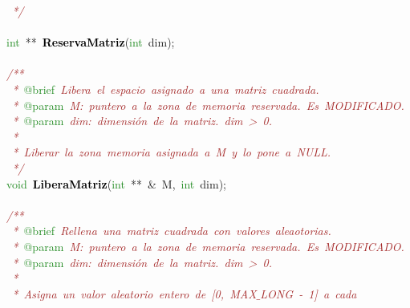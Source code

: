 \mbox{}\textit{\textcolor{Brown}{\ */}} \\
\mbox{} \\
\mbox{}\textcolor{ForestGreen}{int}\ \textcolor{BrickRed}{**}\ \textbf{\textcolor{Black}{ReservaMatriz}}\textcolor{BrickRed}{(}\textcolor{ForestGreen}{int}\ dim\textcolor{BrickRed}{);} \\
\mbox{} \\
\mbox{}\textit{\textcolor{Brown}{/**}} \\
\mbox{}\textit{\textcolor{Brown}{\ *\ }}\textcolor{ForestGreen}{@brief}\textit{\textcolor{Brown}{\ Libera\ el\ espacio\ asignado\ a\ una\ matriz\ cuadrada.}} \\
\mbox{}\textit{\textcolor{Brown}{\ *\ }}\textcolor{ForestGreen}{@param}\textit{\textcolor{Brown}{\ M:\ puntero\ a\ la\ zona\ de\ memoria\ reservada.\ Es\ MODIFICADO.}} \\
\mbox{}\textit{\textcolor{Brown}{\ *\ }}\textcolor{ForestGreen}{@param}\textit{\textcolor{Brown}{\ dim:\ dimensión\ de\ la\ matriz.\ dim\ \textgreater{}\ 0.}} \\
\mbox{}\textit{\textcolor{Brown}{\ *\ }} \\
\mbox{}\textit{\textcolor{Brown}{\ *\ Liberar\ la\ zona\ memoria\ asignada\ a\ M\ y\ lo\ pone\ a\ NULL.}} \\
\mbox{}\textit{\textcolor{Brown}{\ */}} \\
\mbox{}\textcolor{ForestGreen}{void}\ \textbf{\textcolor{Black}{LiberaMatriz}}\textcolor{BrickRed}{(}\textcolor{ForestGreen}{int}\ \textcolor{BrickRed}{**}\ \textcolor{BrickRed}{\&}\ M\textcolor{BrickRed}{,}\ \textcolor{ForestGreen}{int}\ dim\textcolor{BrickRed}{);} \\
\mbox{} \\
\mbox{}\textit{\textcolor{Brown}{/**}} \\
\mbox{}\textit{\textcolor{Brown}{\ *\ }}\textcolor{ForestGreen}{@brief}\textit{\textcolor{Brown}{\ Rellena\ una\ matriz\ cuadrada\ con\ valores\ aleaotorias.}} \\
\mbox{}\textit{\textcolor{Brown}{\ *\ }}\textcolor{ForestGreen}{@param}\textit{\textcolor{Brown}{\ M:\ puntero\ a\ la\ zona\ de\ memoria\ reservada.\ Es\ MODIFICADO.}} \\
\mbox{}\textit{\textcolor{Brown}{\ *\ }}\textcolor{ForestGreen}{@param}\textit{\textcolor{Brown}{\ dim:\ dimensión\ de\ la\ matriz.\ dim\ \textgreater{}\ 0.}} \\
\mbox{}\textit{\textcolor{Brown}{\ *\ }} \\
\mbox{}\textit{\textcolor{Brown}{\ *\ Asigna\ un\ valor\ aleatorio\ entero\ de\ [0,\ MAX$\_$LONG\ -\ 1]\ a\ cada}} \\
